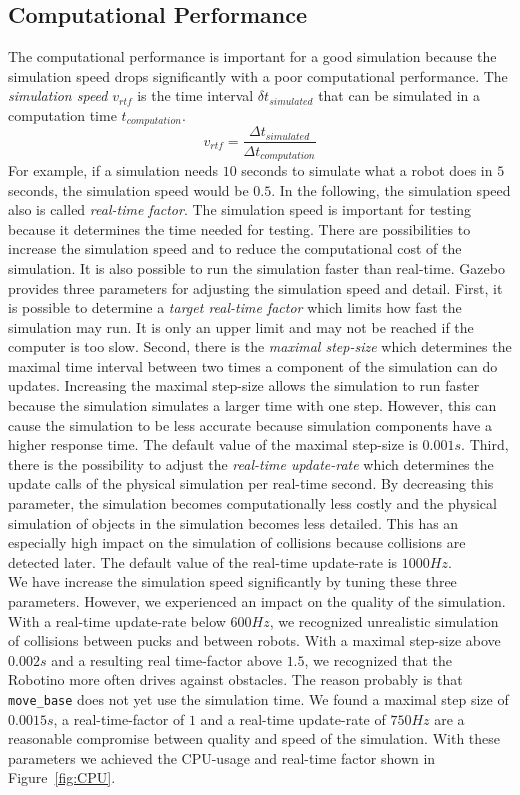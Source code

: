 \subsection{Computational Performance}
The computational performance is important for a good simulation because the simulation speed drops significantly with a poor computational performance. The \textit{simulation speed} $v_{rtf}$ is the time interval $\delta t_{simulated}$ that can be simulated in a computation time $t_{computation}$.
$$
v_{rtf} = \frac{\Delta t_{simulated}}{\Delta t_{computation}}
$$
For example, if a simulation needs $10$ seconds to simulate what a robot does in $5$ seconds, the simulation speed would be $0.5$. In the following, the simulation speed also is called \textit{real-time factor}. The simulation speed is important for testing because it determines the time needed for testing. There are possibilities to increase the simulation speed and to reduce the computational cost of the simulation. It is also possible to run the simulation faster than real-time. Gazebo provides three parameters for adjusting the simulation speed and detail. First, it is possible to determine a \textit{target real-time factor} which limits how fast the simulation may run. It is only an upper limit and may not be reached if the computer is too slow. Second, there is the \textit{maximal step-size} which determines the maximal time interval between two times a component of the simulation can do updates. Increasing the maximal step-size allows the simulation to run faster because the simulation simulates a larger time with one step. However, this can cause the simulation to be less accurate because simulation components have a higher response time. The default value of the maximal step-size is $0.001s$. Third, there is the possibility to adjust the \textit{real-time update-rate} which determines the update calls of the  physical simulation per real-time second. By decreasing this parameter, the simulation becomes computationally less costly and the physical simulation of objects in the simulation becomes less detailed. This has an especially high impact on the simulation of collisions because collisions are detected later. The default value of the real-time update-rate is $1000 Hz$.\\
We have increase the simulation speed significantly by tuning these three parameters. However, we experienced an impact on the quality of the simulation. With a real-time update-rate below $600Hz$, we recognized unrealistic simulation of collisions between pucks and between robots. With a maximal step-size above $0.002s$ and a resulting real time-factor above $1.5$, we recognized that the Robotino more often drives against obstacles. The reason probably is that \texttt{move\_base} does not yet use the simulation time. We found a maximal step size of $0.0015s$, a real-time-factor of $1$ and a real-time update-rate of $750Hz$ are a reasonable compromise between quality and speed of the simulation. With these parameters we achieved the CPU-usage and real-time factor shown in Figure~\ref{fig:CPU}.

